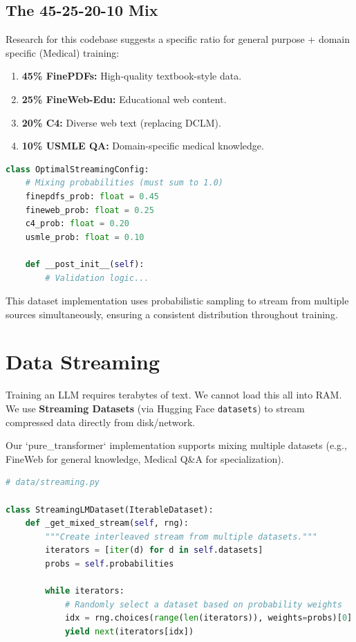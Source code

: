 \subsection{The 45-25-20-10 Mix}
Research for this codebase suggests a specific ratio for general purpose + domain specific (Medical) training:
\begin{enumerate}
    \item \textbf{45\% FinePDFs:} High-quality textbook-style data.
    \item \textbf{25\% FineWeb-Edu:} Educational web content.
    \item \textbf{20\% C4:} Diverse web text (replacing DCLM).
    \item \textbf{10\% USMLE QA:} Domain-specific medical knowledge.
\end{enumerate}

\begin{lstlisting}[language=Python, caption=Optimal Streaming Mix]
class OptimalStreamingConfig:
    # Mixing probabilities (must sum to 1.0)
    finepdfs_prob: float = 0.45
    fineweb_prob: float = 0.25
    c4_prob: float = 0.20
    usmle_prob: float = 0.10

    def __post_init__(self):
        # Validation logic...
\end{lstlisting}

This dataset implementation uses probabilistic sampling to stream from multiple sources simultaneously, ensuring a consistent distribution throughout training.

\section{Data Streaming}
Training an LLM requires terabytes of text. We cannot load this all into RAM. We use \textbf{Streaming Datasets} (via Hugging Face \texttt{datasets}) to stream compressed data directly from disk/network.

Our `pure_transformer` implementation supports mixing multiple datasets (e.g., FineWeb for general knowledge, Medical Q\&A for specialization).

\begin{lstlisting}[language=Python, caption=Interleaved Streaming]
# data/streaming.py

class StreamingLMDataset(IterableDataset):
    def _get_mixed_stream(self, rng):
        """Create interleaved stream from multiple datasets."""
        iterators = [iter(d) for d in self.datasets]
        probs = self.probabilities
        
        while iterators:
            # Randomly select a dataset based on probability weights
            idx = rng.choices(range(len(iterators)), weights=probs)[0]
            yield next(iterators[idx])
\end{lstlisting}
